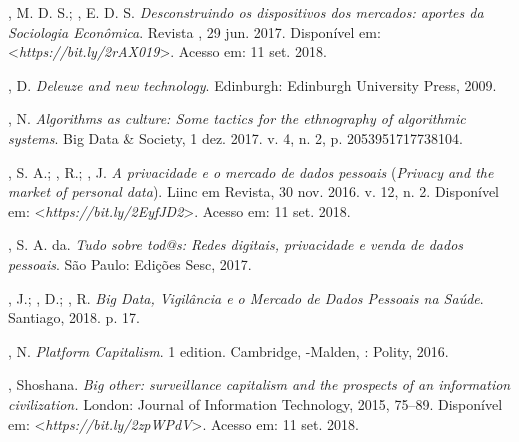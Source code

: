 \begin{Parskip}
, M. D. S.; , E. D. S. \emph{Desconstruindo os
dispositivos dos mercados: aportes da Sociologia Econômica}. Revista
, 29 jun. 2017. Disponível em: \textless{}\emph{https://bit.ly/2rAX019}\textgreater{}. Acesso em: 11 set. 2018.

, D. \emph{Deleuze and new technology}. Edinburgh: Edinburgh
University Press, 2009.

, N. \emph{Algorithms as culture: Some tactics for the
ethnography of algorithmic systems}. Big Data \& Society, 1 dez. 2017. v.
4, n. 2, p. 2053951717738104.

, S. A.; , R.; , J. \emph{A privacidade e o
mercado de dados pessoais} (\emph{Privacy and the market of personal
data}). Liinc em Revista, 30 nov. 2016. v. 12, n. 2. Disponível em:
\textless{}\emph{https://bit.ly/2EyfJD2}\textgreater{}. Acesso em: 11 set. 2018.

, S. A. da. \emph{Tudo sobre tod@s: Redes digitais,
privacidade e venda de dados pessoais}. São Paulo: Edições Sesc, 2017.

, J.; , D.; , R. \emph{Big Data, Vigilância e o
Mercado de Dados Pessoais na Saúde}. Santiago, 2018. p. 17.

, N. \emph{Platform Capitalism}. 1 edition. Cambridge, -Malden,
: Polity, 2016.

, Shoshana. \emph{Big other: surveillance capitalism and the
prospects of an information civilization.} London: Journal of
Information Technology, 2015, 75--89. Disponível em: \textless{}\emph{https://bit.ly/2zpWPdV}\textgreater{}. Acesso em: 11 set. 2018.
\end{Parskip}
